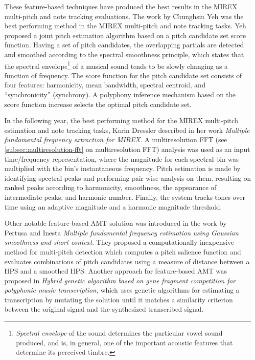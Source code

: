 These feature-based techniques have produced the best results in the \ac{MIREX} multi-pitch and note tracking
evaluations. The work by Chunghsin Yeh\cite{fundamental-frequency-estimation} was the best performing method in
the \ac{MIREX} multi-pitch and note tracking tasks. Yeh proposed a joint pitch estimation algorithm based on a pitch
candidate set score function. Having a set of pitch candidates, the overlapping partials are detected and smoothed
according to the spectral smoothness principle, which states that the spectral envelope\footnote{\textit{Spectral
envelope} of the sound determines the particular vowel sound produced, and is, in general, one of the important acoustic
features that determine its perceived timbre\cite{kumar2007hierarchical}.} of a musical sound tends to be slowly
changing as a function of frequency. The score function for the pitch candidate set consists of four features:
harmonicity, mean bandwidth, spectral centroid, and ``synchronicity'' (synchrony). A polyphony inference mechanism based
on the score function increase selects the optimal pitch candidate set\cite{fundamental-frequency-estimation}.

In the following year, the best performing method for the \ac{MIREX} multi-pitch estimation and note tracking tasks,
Karin Dressler described in her work \textit{Multiple fundamental frequency extraction for MIREX}\cite{dressler2012multiple}.
A multiresolution \ac{FFT} (see \cref{subsec:multiresolution-fft} on multiresolution \ac{FFT}) analysis was used as
an input time/frequency representation, where the magnitude for each spectral bin was multiplied with the bin’s
instantaneous frequency. Pitch estimation is made by identifying spectral peaks and performing pair-wise analysis on
them, resulting on ranked peaks according to harmonicity, smoothness, the appearance of intermediate peaks, and harmonic
number. Finally, the system tracks tones over time using an adaptive magnitude and a harmonic magnitude threshold.

Other notable feature-based \ac{AMT} solution was introduced in the work by Pertusa and Inesta \textit{Multiple
fundamental frequency estimation using Gaussian smoothness and short context}\cite{pertusa2008multiple}. They proposed
a computationally inexpensive method for multi-pitch detection which computes a pitch salience function and evaluates
combinations of pitch candidates using a measure of distance between a \ac{HPS} and a smoothed \ac{HPS}. Another
approach for feature-based \ac{AMT} was proposed in \textit{Hybrid genetic algorithm based on gene fragment competition
for polyphonic music transcription}\cite{reis2008hybrid}, which uses genetic algorithms for estimating a transcription
by mutating the solution until it matches a similarity criterion between the original signal and the synthesized
transcribed signal.

